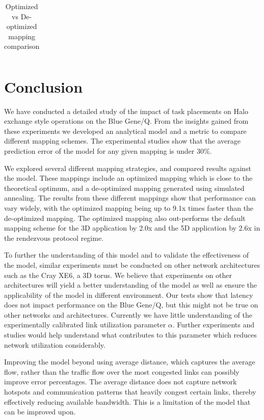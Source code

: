 \documentclass{acm_proc_article-sp}
\begin{document}
\begin{table}[!t]
  \caption{Optimized vs De-optimized mapping comparison
    \label{table:optimized vs deoptimized}}
  {\footnotesize
    \begin{tabular}{ | l | l | l | p{1.5cm} |}
    \hline
    
    \hline
    \end{tabular}
  }
\end{table}


\section{Conclusion}

We have conducted a detailed study of the impact of task placements on Halo exchange
style operations on the Blue Gene/Q. From the insights gained from these experiments
we developed an analytical model and a metric to compare different mapping schemes.
The experimental studies show that the average prediction error of the model for any
given mapping is under 30\%.

We explored several different mapping strategies, and compared results against the model.
These mappings include an optimized mapping which is close to the theoretical optimum,
and a de-optimized mapping generated using simulated annealing. The results from these
different mappings show that performance can vary widely, with the optimized mapping
being up to 9.1x times faster than the de-optimized mapping. The optimized mapping also out-performs
the default mapping scheme for the 3D application by 2.0x and the 5D application
by 2.6x in the rendezvous protocol regime.

To further the understanding of this model and to validate the effectiveness of the model,
similar experiments must be conducted on other network architectures such as the Cray XE6, a 3D torus.
We believe that experiments on other architectures will yield a better understanding of the model
as well as ensure the applicability of the model in different environment. Our tests show that
latency does not impact performance on the Blue Gene/Q, but this might not be true on other networks
and architectures. Currently we have little understanding of the experimentally calibrated
link utilization parameter $\alpha$. Further experiments and studies would help understand what
contributes to this parameter which reduces network utilization considerably.

Improving the model beyond using average distance, which captures the average flow, rather than
the traffic flow over the most congested links can possibly improve error percentages. The average
distance does not capture network hotspots and communication patterns that heavily congest certain
links, thereby effectively reducing available bandwidth. This is a limitation of the model that can be
improved upon.
\end{document}
